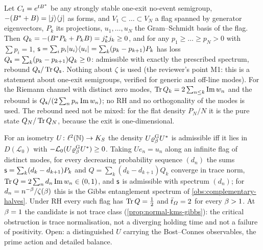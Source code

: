 \begin{theorem}
\label{thm:flag-spectrum-attainable}
Let $C_t = e^{tB^{*}}$ be any strongly stable one-exit no-event semigroup, $-(B^{*}+B)
= |j\rangle\langle j|$ as forms, and $V_1\subset\dots\subset V_N$ a flag spanned by generator
eigenvectors, $P_k$ its projections, $u_1,\dots,u_N$ the Gram--Schmidt basis of the flag. Then
$Q_k = -(B^{*}P_k+P_kB) = j_k^{*}j_k\ge0$, and for any $p_1\ge\dots\ge p_N>0$ with $\sum p_i =
1$, $\mathsf s = \sum_ip_i|u_i\rangle\langle u_i| = \sum_k(p_k-p_{k+1})P_k$ has loss $Q_{\mathsf s} =
\sum_k(p_k-p_{k+1})Q_k\ge0$: admissible with exactly the prescribed spectrum, rebound
$Q_{\mathsf s}/\operatorname{Tr} Q_{\mathsf s}$. Nothing about $\zeta$ is used (the reviewer's point M1: this is a
statement about one-exit semigroups, verified for generic and off-line modes). For the Riemann
channel with distinct zero modes, $\operatorname{Tr} Q_k = 2\sum_{n\le k}\operatorname{Im} w_n$ and the rebound is
$Q_{\mathsf s}/(2\sum_np_n\operatorname{Im} w_n)$; no RH and no orthogonality of the modes is used. The rebound need
not be mixed: for the flat density $P_N/N$ it is the pure state $Q_N/\operatorname{Tr} Q_N$, because the exit is
one-dimensional.
\end{theorem}

\begin{proposition}
\label{prop:gibbs-flag-isometry}
For an isometry $U\colon\ell^2(\mathbb N)\to K_S$ the density $U\varrho^{\mathrm{G}}_{\beta}U^{*}$ is admissible iff
it lies in $D(\mathcal L_0)$ with $-\mathcal L_0(U\varrho^{\mathrm{G}}_{\beta}U^{*})\ge0$. Taking $Ue_n = u_n$ along an
infinite flag of distinct modes, for every decreasing probability sequence $(d_n)$ the sums $\mathsf s =
\sum_k(d_k-d_{k+1})P_k$ and $Q = \sum_k(d_k-d_{k+1})Q_k$ converge in trace norm, $\operatorname{Tr} Q = 2\sum_nd_n
\operatorname{Im} w_n\in(0,1)$, and $\mathsf s$ is admissible with spectrum $(d_n)$; for $d_n = n^{-\beta}/\zeta(\beta)$
this is the Gibbs entanglement spectrum of \cref{obs:complementary-halves}. Under RH every such flag
has $\operatorname{Tr} Q = \tfrac12$ and $\bar t_{\varOmega} = 2$ for every $\beta>1$. At $\beta = 1$ the candidate is not
trace class (\cref{prop:normal-kms-gibbs}): the critical obstruction is trace normalisation, not a
diverging holding time and not a failure of positivity. Open: a distinguished $U$ carrying the
Bost--Connes observables, the prime action and detailed balance.
\end{proposition}

